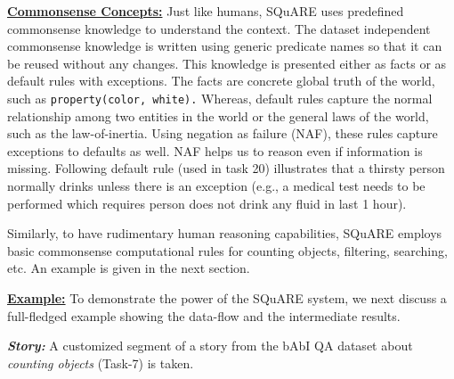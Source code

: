 \documentclass[letterpaper]{article}
\begin{document}
\medskip
\noindent\textbf{\underline{Commonsense Concepts:}}
Just like humans, SQuARE uses predefined commonsense knowledge to understand the context. The dataset independent commonsense knowledge is written using generic predicate names so that it can be reused without any changes. This knowledge is presented either as facts or as default rules with exceptions. The facts are concrete global truth of the world, such as \texttt{property(color, white).} Whereas, default rules capture the normal relationship among two entities in the world or the general laws of the world, such as the law-of-inertia. Using negation as failure (NAF), these rules capture exceptions to defaults as well. NAF helps us to reason even if information is missing. Following default rule (used in task 20) illustrates that a thirsty person normally drinks unless there is an exception (e.g., a medical test needs to be performed which requires person does not drink any fluid in last 1 hour).

\smallskip
\noindent
\cprotect {}

\smallskip\noindent
Similarly, to have rudimentary human reasoning capabilities, SQuARE employs basic commonsense computational rules for counting objects, filtering, searching, etc. An example is given in the next section.

\noindent\textbf{\underline{Example:}}
To demonstrate the power of the SQuARE system, we next discuss a full-fledged example showing the data-flow and the intermediate results.

\noindent \textit{\textbf{Story:} } A customized segment of a story from the bAbI QA dataset about \textit{counting objects} (Task-7) is taken.

\smallskip
\noindent
\cprotect {}
\end{document}
